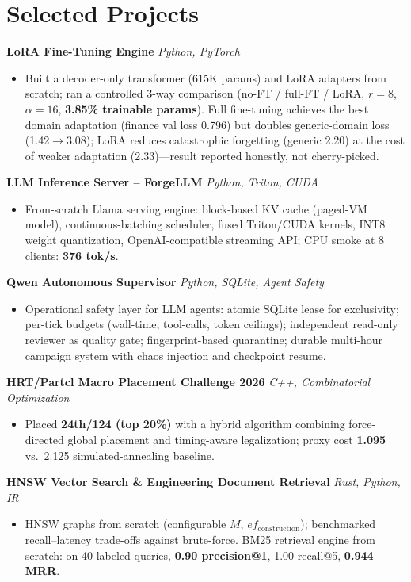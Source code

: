 \documentclass[10pt,a4paper]{article}
\newcommand{\project}[2]{\textbf{#1} \hfill \textit{#2}\par}
\begin{document}
\section*{Selected Projects}
\project{LoRA Fine-Tuning Engine}{Python, PyTorch}
\begin{itemize}
\item Built a decoder-only transformer (615K params) and LoRA adapters from scratch; ran a controlled 3-way comparison (no-FT / full-FT / LoRA, $r{=}8$, $\alpha{=}16$, \textbf{3.85\% trainable params}). Full fine-tuning achieves the best domain adaptation (finance val loss 0.796) but doubles generic-domain loss (1.42$\to$3.08); LoRA reduces catastrophic forgetting (generic 2.20) at the cost of weaker adaptation (2.33)---result reported honestly, not cherry-picked.
\end{itemize}
\project{LLM Inference Server -- ForgeLLM}{Python, Triton, CUDA}
\begin{itemize}
\item From-scratch Llama serving engine: block-based KV cache (paged-VM model), continuous-batching scheduler, fused Triton/CUDA kernels, INT8 weight quantization, OpenAI-compatible streaming API; CPU smoke at 8 clients: \textbf{376 tok/s}.
\end{itemize}
\project{Qwen Autonomous Supervisor}{Python, SQLite, Agent Safety}
\begin{itemize}
\item Operational safety layer for LLM agents: atomic SQLite lease for exclusivity; per-tick budgets (wall-time, tool-calls, token ceilings); independent read-only reviewer as quality gate; fingerprint-based quarantine; durable multi-hour campaign system with chaos injection and checkpoint resume.
\end{itemize}
\project{HRT/Partcl Macro Placement Challenge 2026}{C++, Combinatorial Optimization}
\begin{itemize}
\item Placed \textbf{24th/124 (top 20\%)} with a hybrid algorithm combining force-directed global placement and timing-aware legalization; proxy cost \textbf{1.095} vs.\ 2.125 simulated-annealing baseline.
\end{itemize}
\project{HNSW Vector Search \& Engineering Document Retrieval}{Rust, Python, IR}
\begin{itemize}
\item HNSW graphs from scratch (configurable $M$, $ef_\text{construction}$); benchmarked recall--latency trade-offs against brute-force. BM25 retrieval engine from scratch: on 40 labeled queries, \textbf{0.90 precision@1}, 1.00 recall@5, \textbf{0.944 MRR}.
\end{itemize}
\end{document}
